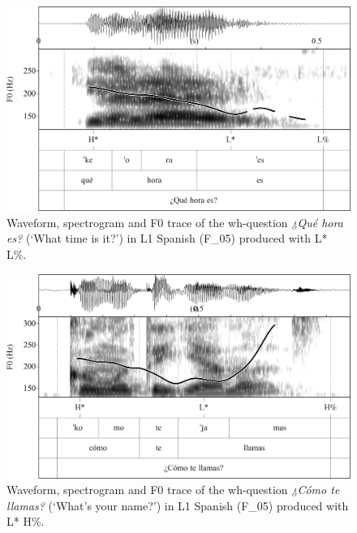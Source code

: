 \begin{figure}


\includegraphics[width=\textwidth]{figures/Figure_4.91.png}



\caption{Waveform, spectrogram and F0 trace of the wh-question \textit{¿Qué hora es?} (‘What time is it?’) in L1 Spanish (F\_05) produced with L* L\%.}
\label{fig:4.91}
\end{figure}

\begin{figure}


\includegraphics[width=\textwidth]{figures/Figure_4.92.png}



\caption{Waveform, spectrogram and F0 trace of the wh-question \textit{¿Cómo te llamas?} (‘What’s your name?’) in L1 Spanish (F\_05) produced with L* H\%.}
\label{fig:4.92}
\end{figure}

